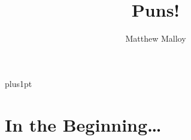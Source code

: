 \documentclass[11pt, openany, oneside]{Latex/Classes/PhDthesisPSnPDF}
\title{Puns!} %
\author[yollam.ttam@gmail.com]{Matthew Malloy} %
\begin{document}
\renewcommand\baselinestretch{1.2}
\baselineskip=18pt plus1pt


\maketitle  

\makecopyright  







\setcounter{secnumdepth}{3} %
\setcounter{tocdepth}{3}    %
\tableofcontents            %


\listoftables  %

\listoffigures	





\mainmatter

	

\part{In the Beginning\ldots}
\end{document}
